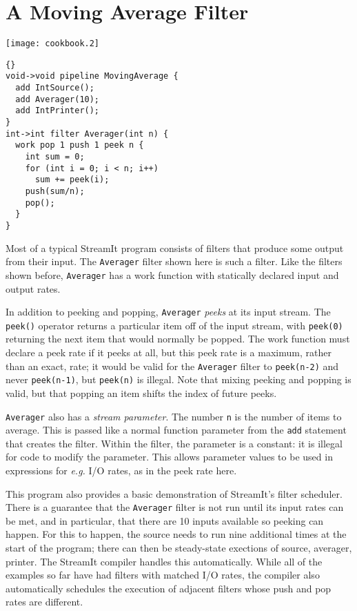 \section{A Moving Average Filter}

\begin{textpic}{\texttt{[image: cookbook.2]}}
\begin{lstlisting}{}
void->void pipeline MovingAverage {
  add IntSource();
  add Averager(10);
  add IntPrinter();
}
int->int filter Averager(int n) {
  work pop 1 push 1 peek n {
    int sum = 0;
    for (int i = 0; i < n; i++)
      sum += peek(i);
    push(sum/n);
    pop();
  }
}
\end{lstlisting}
\end{textpic}

Most of a typical StreamIt program consists of filters that produce
some output from their input.  The \lstinline|Averager| filter shown
here is such a filter.  Like the filters shown before,
\lstinline|Averager| has a work function with statically declared
input and output rates.

In addition to peeking and popping, \lstinline|Averager| \emph{peeks}
at its input stream.  The \lstinline|peek()| operator returns a
particular item off of the input stream, with \lstinline|peek(0)|
returning the next item that would normally be popped.  The work
function must declare a peek rate if it peeks at all, but this peek
rate is a maximum, rather than an exact, rate; it would be valid for
the \lstinline|Averager| filter to \lstinline|peek(n-2)| and never
\lstinline|peek(n-1)|, but \lstinline|peek(n)| is illegal.  Note that
mixing peeking and popping is valid, but that popping an item shifts
the index of future peeks.

\lstinline|Averager| also has a \emph{stream parameter}.  The number
\lstinline|n| is the number of items to average.  This is passed like
a normal function parameter from the \lstinline|add| statement that
creates the filter.  Within the filter, the parameter is a constant:
it is illegal for code to modify the parameter.  This allows parameter
values to be used in expressions for \emph{e.g.} I/O rates, as in the
peek rate here.

This program also provides a basic demonstration of StreamIt's filter
scheduler.  There is a guarantee that the \lstinline|Averager| filter
is not run until its input rates can be met, and in particular, that
there are 10 inputs available so peeking can happen.  For this to
happen, the source needs to run nine additional times at the start of
the program; there can then be steady-state exections of source,
averager, printer.  The StreamIt compiler handles this automatically.
While all of the examples so far have had filters with matched I/O
rates, the compiler also automatically schedules the execution of
adjacent filters whose push and pop rates are different.


